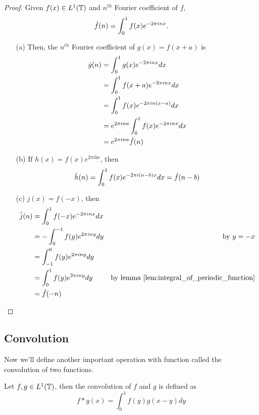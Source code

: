   \begin{proof}
     Given $f(x) \in L^1(\mathbb T)$ and $n^{th}$ Fourier coefficient of $f$,  
    \[\hat{f}(n) = \int_{0}^{1}f(x)e^{-2 \pi inx}.\]
    \begin{enumerate}
      \item[(a)] Then, the $n^{th}$ Fourier coefficient of $g(x) = f(x+a)$ is
        \begin{align*}
          \hat{g}(n) &= \int_{0}^{1}g(x)e^{-2\pi inx} dx \\
                &= \int_{0}^{1}f(x+a)e^{-2\pi inx} dx \\
                &= \int_{0}^{1}f(x)e^{-2\pi in(x-a)} dx \\
                &= e^{2\pi ina} \int_0^1 f(x)e^{-2\pi inx} dx \\
                &= e^{2\pi ina} \hat{f}(n)
        \end{align*}

      \item[(b)] If $h(x) = f(x)e^{2\pi ibx}$, then
        \begin{displaymath}
          \hat{h}(n) = \int_0^1 f(x)e^{-2 \pi i (n-b)x} dx = \hat{f}(n-b)
        \end{displaymath}
      \item[(c)] $j(x) = f(-x)$, then
        \begin{align*}
          \hat{j}(n)  &= \int_0^1 f(-x)e^{-2\pi inx} dx \\
                    &= -\int_0^{-1} f(y) e^{2\pi iny}dy & \text{by } y=-x\\
                    &= \int_{-1}^0 f(y)e^{2\pi iny}dy \\
                    &= \int_0^1 f(y)e^{2\pi iny}dy & \text{by lemma }\ref{lem:integral_of_periodic_function}\\
                    &= \hat{f}(-n)
        \end{align*}
        
        
    \end{enumerate}
  \end{proof}


  \subsection{Convolution}
  Now we'll define another important operation with function called the convolution of two functions.
  \begin{definition}
    Let $f, g \in L^1(\mathbb T)$, then the convolution of $f$ and $g$ is defined as 
    \begin{displaymath}
      f*g(x) = \int_0^1 f(y)g(x-y)dy
    \end{displaymath}
  \end{definition}

